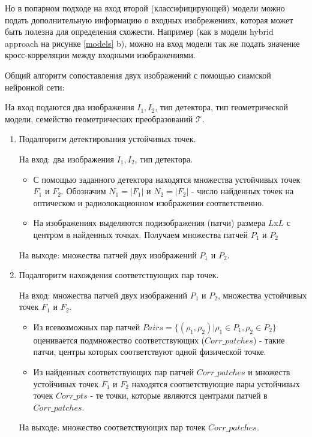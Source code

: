 \documentclass[a4paper,12pt]{article}
\begin{document}
Но в попарном подходе на вход второй (классифицирующей) модели можно подать дополнительную информацию о входных изобрежениях, которая может быть полезна для определения схожести. Например (как в модели hybrid approach на рисунке \ref{models} b), можно на вход модели так же подать значение кросс-корреляции между входными изображениями.

Общий алгоритм сопоставления двух изображений с помощью сиамской нейронной сети:

На вход подаются два изображения $I_{1}, I_{2}$, тип детектора, тип геометрической модели, семейство геометрических преобразований $\mathcal{T}$.
\begin{enumerate}
    \item Подалгоритм детектирования устойчивых точек. 
    
    На вход: два изображения $I_{1}, I_{2}$, тип детектора.
        \begin{itemize}
            \item С помощью заданного детектора находятся множества устойчивых точек $F_{1}$ и $F_{2}$. Обозначим $N_{1} = |F_{1}|$ и $N_{2} = |F_{2}|$ - число найденных точек на оптическом и радиолокационном изображении соответственно.
            \item На изображениях выделяются подизображения (патчи) размера $L$x$L$ с центром в найденных точках. Получаем множества патчей $P_{1}$ и $P_{2}$
        \end{itemize}
        На выходе: множества патчей двух изображений $P_{1}$ и $P_{2}$.
        
    \item Подалгоритм нахождения соответствующих пар точек.
    
    На вход: множества патчей двух изображений $P_{1}$ и $P_{2}$, множества устойчивых точек $F_{1}$ и $F_{2}$.
        \begin{itemize}
            \item Из всевозможных пар патчей $Pairs = \{ (\rho_{1}, \rho_{2}) | \rho_{1} \in P_{1}, \rho_{2} \in P_{2}\}$  оценивается подмножество соответствующих ($Corr\_patches$)  - такие патчи, центры которых соответствуют одной физической точке.
            \item Из найденных соответствующих пар патчей $Corr\_patches$ и множеств устойчивых точек $F_{1}$ и $F_{2}$ находятся соответствующие пары устойчивых точек $Corr\_pts$ - те точки, которые являются центрами патчей в $Corr\_patches$.
        \end{itemize}
    На выходе: множество соответствующих пар точек $Corr\_patches$.
    

\end{enumerate}
\end{document}
